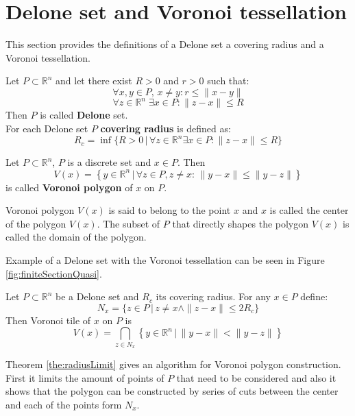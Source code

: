 \documentclass[text.tex]{subfiles}
\begin{document}
\section{Delone set and Voronoi tessellation}

This section provides the definitions of a Delone set a covering radius and a Voronoi tessellation.

\begin{definition}
\label{def:Delone}
Let $P\subset \mathbb{R}^n$ and let there exist $R>0$ and $ r>0$ such that:
$$\forall x,y\in P,\, x\neq y: r\leq \|x-y\|$$
$$\forall z\in\mathbb{R}^n\; \exists x\in P: \|z-x\|\leq R$$
Then $P$ is called \textbf{Delone} set.\\
For each Delone set $P$ \textbf{covering radius} is defined as:
$$R_c = \inf\{R>0\,|\, \forall z\in\mathbb{R}^n \exists x\in P: \|z-x\|\leq R\}$$
\end{definition}

\begin{definition}
Let $P\subset \mathbb{R}^n$, $P$ is a discrete set and $x\in P$. Then
$$V(x) = \left\{ y \in \mathbb{R}^n \,|\, \forall z \in P, z\neq x:\, \|y-x\|\leq\|y-z\| \right\}$$
is called \textbf{Voronoi polygon} of $x$ on $P$.

Voronoi polygon $V(x)$ is said to belong to the point $x$ and $x$ is called the center of the polygon $V(x)$. The subset of $P$ that directly shapes the polygon $V(x)$ is called the domain of the polygon.
\end{definition}

\begin{remark}
Example of a Delone set with the Voronoi tessellation can be seen in Figure \ref{fig:finiteSectionQuasi}.
\end{remark}

\begin{theorem}
\label{the:radiusLimit}
Let $P\subset \mathbb{R}^n$ be a Delone set and $R_c$ its covering radius. For any $x\in P$ define:
$$N_x = \{z\in P\,|\, z\neq x \wedge \|z-x\|\leq 2R_c\}$$
Then Voronoi tile of $x$ on $P$ is
$$V(x) = \bigcap_{z\in N_x} \left\{ y \in \mathbb{R}^n \,|\, \|y-x\|<\|y-z\| \right\}$$
\end{theorem}

\begin{remark}
Theorem \ref{the:radiusLimit} gives an algorithm for Voronoi polygon construction. First it limits the amount of points of $P$ that need to be considered and also it shows that the polygon can be constructed by series of cuts between the center and each of the points form $N_x$. 
\end{remark}
%
\clearpage
\end{document}
